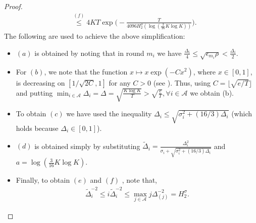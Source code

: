 \begin{proof}
\begin{align*}
& \overset{(f)}{\le}4KT \exp\bigg(- \frac{T}{4096 H_{2}^{\sigma} (\log(\frac{3}{16} K\log K))}\bigg).
\end{align*}
The following are used to achieve the above simplification:
\begin{itemize}
\item $(a)$ is obtained by noting that in round $m_i$ we have $\frac{\Delta_i}{4}\leq\sqrt{\epsilon_{m_{i}}\rho}<\frac{\Delta_i}{2}$.
\item For $(b)$, we note that the function $x\mapsto x\exp(-Cx^2)$, where $x\in[0,1]$, is  decreasing on $[1/\sqrt{2C},1]$ for any $C>0$ (see \cite{bubeck2011pure,auer2010ucb}). Thus, using $C=\lfloor \sqrt{e/T}\rfloor$ and putting $\min_{i\in \mathcal{A}}\Delta_i =\Delta =\sqrt{\frac{K\log K}{T}} > \sqrt{\frac{e}{T}},\forall i\in \mathcal{A}$ we obtain (b).
\item To obtain $(c)$ we have used the inequality $\Delta_i\le \sqrt{\sigma_{i}^{2} + (16/3)\Delta_{i}}$ (which holds because $\Delta_i\in[0,1]$).
\item $(d)$ is obtained simply by substituting $\tilde{\Delta}_i=\frac{\Delta_{i}^{2}}{\sigma_{i}+\sqrt{\sigma_{i}^{2}+(16/3)\Delta_{i}}}$ and $a=\log(\frac{3}{16} K\log K)$.
\item Finally, to obtain $(e)$ and $(f)$ , note that, 
\begin{align*}
\tilde{\Delta}_i^{-2}\le i\tilde{\Delta}_i^{-2} \le \max_{j\in\mathcal{A}}j\Delta_{(j)}^{-2}=H_2^\sigma.
\end{align*}
\end{itemize}
\noindent
  


\end{proof}
